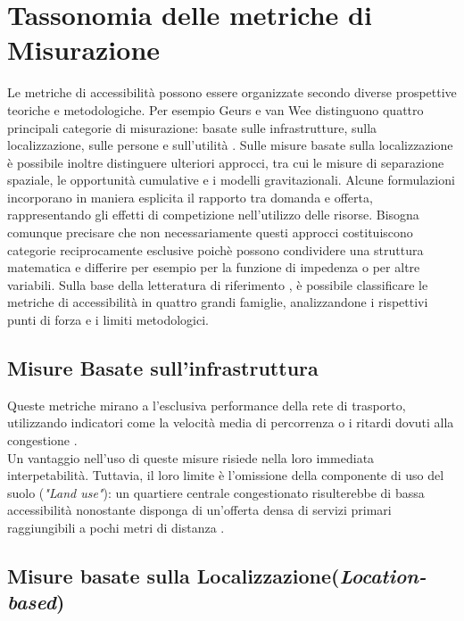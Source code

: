 \section{Tassonomia delle metriche di Misurazione}
Le metriche di accessibilità possono essere organizzate secondo diverse prospettive teoriche e metodologiche. Per esempio Geurs e van Wee distinguono quattro principali categorie di misurazione: basate sulle infrastrutture, sulla localizzazione, sulle persone e sull'utilità \cite{geurs2004}.
Sulle misure basate sulla localizzazione è possibile inoltre distinguere ulteriori approcci, tra cui le misure di separazione spaziale, le opportunità cumulative e i modelli gravitazionali.
Alcune formulazioni incorporano in maniera esplicita il rapporto tra domanda e offerta, rappresentando gli effetti di competizione nell'utilizzo delle risorse.
Bisogna comunque precisare che non necessariamente questi approcci costituiscono categorie reciprocamente esclusive poichè possono condividere una struttura matematica e differire per esempio per la funzione di impedenza o per altre variabili.
Sulla base della letteratura di riferimento \cite{geurs2004, mazzulla2024, battiston2024, benassai2026}, è possibile classificare le metriche di accessibilità in quattro grandi famiglie, analizzandone i rispettivi punti di forza e i limiti metodologici.


\subsection{Misure Basate sull'infrastruttura}
Queste metriche mirano a l'esclusiva performance della rete di trasporto, utilizzando indicatori come la velocità media di percorrenza o i ritardi dovuti alla congestione \cite{geurs2004}. \\
Un vantaggio nell'uso di queste misure risiede nella loro immediata interpetabilità. Tuttavia, il loro limite è l'omissione della componente di uso del suolo (\textit{"Land use"}): un quartiere centrale congestionato risulterebbe di bassa accessibilità nonostante disponga di un'offerta densa di servizi primari raggiungibili a pochi metri di distanza \cite{geurs2004}.

\subsection{Misure basate sulla Localizzazione(\textit{Location-based})}

